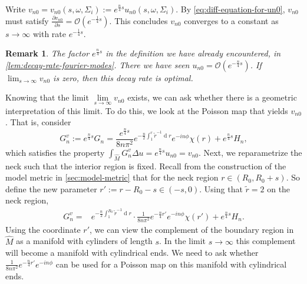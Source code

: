 \documentclass[preprint,12pt]{elsarticle}
\numberwithin{table}{section}
\newtheorem{remark}[lemma]{Remark}
\newcommand{\del}{\partial}
\renewcommand{\d}{\operatorname{d}\!}
\renewcommand{\O}{\mathcal{O}}
\begin{document}
Write $v_{n0} = v_{n0}(s, \omega, \Sigma_i) := e^{\frac{n}{4} s} u_{n0}(s, \omega, \Sigma_i)$. By \cref{eq:diff-equation-for-un0}, $v_{n0}$ must satisfy $\frac{\del v_{n0}}{\del s}
	= \O(e^{- \frac{1}{4} s})$.
This concludes $v_{n0}$ converges to a constant as $s \to \infty$ with rate $e^{- \frac{1}{4}s}$.

\begin{remark}
	The factor $e^{\frac{n}{4} s}$ in the definition we have already encountered, in \cref{lem:decay-rate-fourier-modes}. There we have seen $u_{n0} = \O(e^{- \frac{n}{4} s})$. If $\lim_{s \to \infty} v_{n0}$ is zero, then this decay rate is optimal.
\end{remark}
Knowing that the limit $\lim\limits_{s \to \infty} v_{n0}$ exists, we can ask whether there is a geometric interpretation of this limit. To do this, we look at the Poisson map that yields $v_{n0}$. That is, consider
$$
G_n^{v} := e^{\frac{n}{4}s} G_n = \frac{e^{\frac{n}{4}s}}{8 n \pi^2} e^{- \frac{n}{2} \int_{1}^r \tilde{r}^{-1} \d r} e^{- i n \phi} \chi(r) + e^{\frac{n}{4}s} H_n,
$$
which satisfies the property $\int_{\hat M} G_n^v \Delta u = e^{\frac{n}{4}s} u_{n0} = v_{n0}$. Next, we reparametrize the neck such that the interior region is fixed. Recall from the construction of the model metric in \cref{sec:model-metric} that for the neck region $r \in (R_0, R_0 + s)$. So define the new parameter $r' := r - R_0 - s \in (-s, 0)$. Using that $\tilde r = 2$ on the neck region,
\begin{align}
	G_n^{v} 
	=& e^{- \frac{n}{2} \int_{1}^{R_0} \tilde{r}^{-1} \d r} \cdot \frac{1}{8 n \pi^2} e^{ - \frac{n}{4} r'} e^{- i n \phi} \chi(r') + e^{\frac{n}{4}s} H_n.
\end{align}
Using the coordinate $r'$, we can view the complement of the boundary region in $\hat M$ as a manifold with cylinders of length $s$. In the limit $s \to \infty$ this complement will become a manifold with cylindrical ends. We need to ask whether $\frac{1}{8 n \pi^2} e^{ - \frac{n}{4} r'} e^{- i n \phi}$ can be used for a Poisson map on this manifold with cylindrical ends. 
\end{document}
